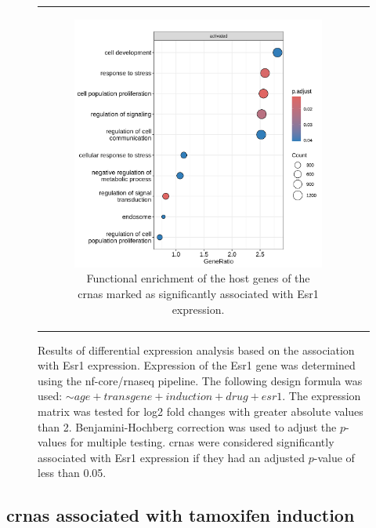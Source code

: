 \begin{figure}[H]
\begin{tabular}{cc}
\begin{subfigure}{0.5\textwidth}
            \includegraphics[width=\linewidth]{chapters/4_results_and_discussion/figures/dea/deseq2/esr1/dot.png}
            \caption{Functional enrichment of the host genes of the
                \glspl{crna} marked as significantly associated with Esr1
                expression.
            }

            \label{fig:esr1_go_terms}
        \end{subfigure}
    \end{tabular}
    \caption{Results of differential expression analysis based on the
        association with Esr1 expression.
        Expression of the Esr1 gene was determined using the nf-core/rnaseq
        pipeline\supercite{patel_nf-corernaseq_2024}.
        The following design formula was used: $\sim age + transgene + induction + drug
            + esr1$.
        The expression matrix was tested for log2 fold changes with greater absolute
        values than 2.
        Benjamini-Hochberg correction was used to adjust the $p$-values for multiple
        testing.
        \Glspl{crna} were considered significantly associated with Esr1
        expression if they had an adjusted $p$-value of less than 0.05.
    }
    \label{fig:dea_esr1}
\end{figure}

\subsection{\Glspl{crna} associated with tamoxifen induction}

